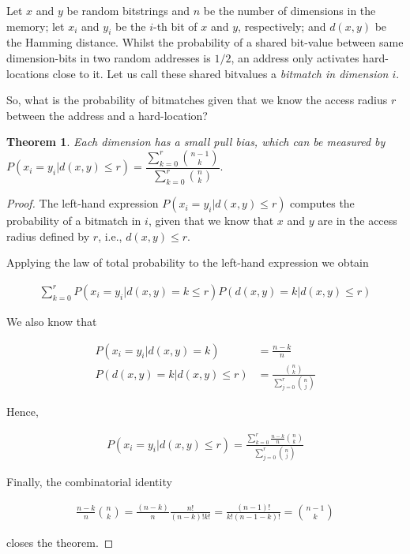 \documentclass[12pt]{article}
\newtheorem{theorem}{Theorem}[section]
\begin{document}
Let $x$ and $y$ be random bitstrings and $n$ be the number of dimensions in the memory; let $x_i$ and $y_i$ be the $i$-th bit of $x$ and $y$, respectively; and $d(x, y)$ be the Hamming distance. Whilst the probability of a shared bit-value between same dimension-bits in two random addresses is $1/2$, an address only activates hard-locations close to it.  Let us call these shared bitvalues a \emph{bitmatch in dimension $i$}.

So, what is the probability of bitmatches given that we know the access radius $r$ between the address and a hard-location?
\bigskip

\begin{theorem}
\emph{Each dimension has a small pull bias, which can be measured by}
\label{T1}
$P(x_i = y_i | d(x, y) \le r) = \dfrac{\sum_{k=0}^{r} \binom{n-1}{k}}{\sum_{k=0}^{r} \binom{n}{k}}.$
\end{theorem}

\begin{proof}
    The left-hand expression $P(x_i = y_i | d(x, y) \le r)$ computes the probability of a bitmatch in $i$, given that we know that $x$ and $y$ are in the access radius defined by $r$, i.e., $d(x, y)\le r$.

    Applying the law of total probability to the left-hand expression we obtain

    \begin{align}
    \sum_{k=0}^{r} P(x_i = y_i | d(x, y) = k \le r) P(d(x, y) = k | d(x, y) \le r)
    \end{align}

    We also know that

    \begin{align}
    P(x_i = y_i | d(x, y) = k) &= \frac{n-k}{n} \\
    P(d(x, y) = k | d(x, y) \le r) &= \frac{\binom{n}{k}}{\sum_{j=0}^{r} \binom{n}{j}}
    \end{align}

    Hence,

    \begin{align}
    P(x_i = y_i | d(x, y) \le r) = \frac{\sum_{k=0}^{r} \frac{n-k}{n} \binom{n}{k}}{\sum_{j=0}^{r} \binom{n}{j}}
    \end{align}

    Finally, the combinatorial identity

    \begin{align}
    \frac{n-k}{n} \binom{n}{k} = \frac{(n-k)}{n} \frac{n!}{(n-k)! k!} = \frac{(n-1)!}{k! (n-1-k)!} = \binom{n-1}{k}
    \end{align}

    closes the theorem.

\end{proof}
\end{document}
